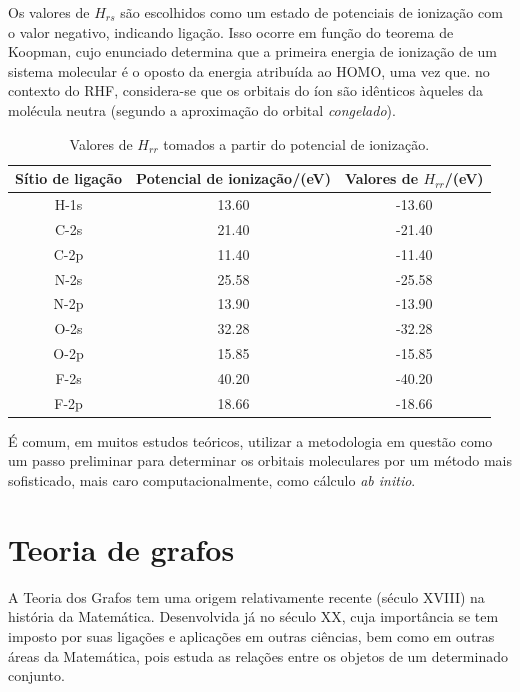  Os valores de $H_{rs}$ são escolhidos como um estado de potenciais de ionização com o valor negativo, indicando ligação. Isso ocorre em função do teorema de Koopman\autocite{Koopmans1934}, cujo enunciado determina que a primeira energia de ionização de um sistema molecular é o oposto da energia atribuída ao \gls{HOMO}, uma vez que. no contexto do \gls{RHF}, considera-se que os orbitais do íon são idênticos àqueles da molécula neutra (segundo a aproximação do orbital \textit{congelado}). 

\begin{table}[htb]
	\centering
	\caption{\label{qua:Quadro_1} Valores de $H_{rr}$ tomados a partir do potencial de ionização.}	
	\begin{tabular}{ccc}
		\toprule
		\textbf{Sítio de ligação} & \textbf{Potencial de ionização/(eV)} & \textbf{Valores de $H_{rr}$/(eV)}
		\\ 
		\midrule
        H-1s & 13.60 & -13.60 \\
        C-2s & 21.40 & -21.40 \\
        C-2p & 11.40 & -11.40 \\
        N-2s & 25.58 & -25.58 \\
        N-2p & 13.90 & -13.90 \\
        O-2s & 32.28 & -32.28 \\
        O-2p & 15.85 & -15.85 \\
        F-2s & 40.20 & -40.20 \\
        F-2p & 18.66 & -18.66 \\
    \bottomrule
	\end{tabular}
\end{table}

É comum, em muitos estudos teóricos\autocite{Zubatiuk2021, BroJrgensen2021}, utilizar a metodologia em questão como um passo preliminar para determinar os orbitais moleculares por um método mais sofisticado, mais caro computacionalmente, como cálculo \textit{ab initio}.

\chapter{Teoria de grafos} \label{ap:graph}

A Teoria dos Grafos tem uma origem relativamente recente (século XVIII) na
história da Matemática. Desenvolvida já no século XX, cuja importância se tem
imposto por suas ligações e aplicações em outras ciências, bem como em outras
áreas da Matemática, pois estuda as relações entre os objetos de um determinado conjunto\autocite{neto2016topicos, soares2014introduccao}.

